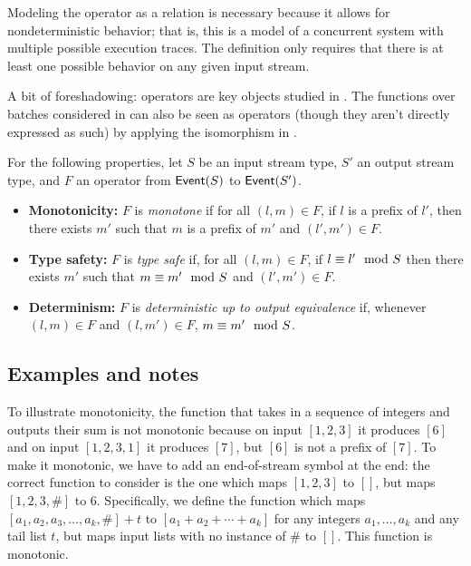 Modeling the operator as a relation is necessary because it allows for nondeterministic behavior; that is, this is a model of a concurrent system with multiple possible execution traces. The definition only requires that there is at least one possible behavior on any given input stream.

A bit of foreshadowing: operators are key objects studied in .
The functions over batches considered in  can also be seen as operators (though they aren't directly expressed as such) by applying the isomorphism in .

For the following properties, let $S$ be an input stream type, $S'$ an output stream type, and $F$ an operator from $\mathsf{Event}(S)$ to $\mathsf{Event}(S')$.
\begin{itemize}
  \item \textbf{Monotonicity:} $F$ is \emph{monotone}
  if for all $(l, m) \in F$, if $l$ is a prefix of $l'$, then there
  exists $m'$ such that $m$ is a prefix of $m'$ and $(l', m') \in F$.

  \item \textbf{Type safety:} $F$ is \emph{type safe} if, for all $(l, m) \in F$, if $l \equiv l' \mod {S}$ then there exists $m'$ such that $m \equiv m' \mod {S}$ and $(l', m') \in F$.

  \item \textbf{Determinism:} $F$ is \emph{deterministic up to output equivalence} if, whenever $(l, m) \in F$ and $(l, m') \in F$, $m \equiv m' \mod {S}$.
\end{itemize}

\subsection{Examples and notes}

To illustrate monotonicity, the function that takes in a sequence of integers and outputs their sum is not monotonic because on input $[1, 2, 3]$ it produces $[6]$ and on input $[1, 2, 3, 1]$ it produces $[7]$, but $[6]$ is not a prefix of $[7]$. To make it monotonic, we have to add an end-of-stream symbol at the end: the correct function to consider is the one which maps $[1, 2, 3]$ to $[]$, but maps $[1, 2, 3, \#]$ to $6$.
Specifically, we define the function which maps $[a_1, a_2, a_3, \ldots, a_k, \#] + t$ to $[a_1 + a_2 + \cdots + a_k]$ for any integers $a_1, \ldots, a_k$ and any tail list $t$, but maps input lists with no instance of $\#$ to $[]$. This function is monotonic.

